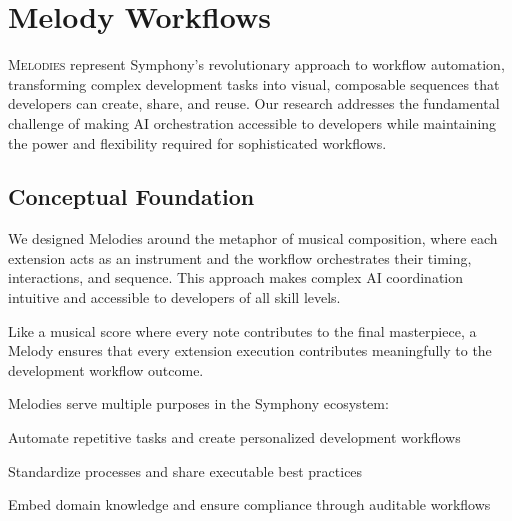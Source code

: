 
\section*{Melody Workflows}

\lettrine{M}{elodies} represent Symphony's revolutionary approach to workflow automation, transforming complex development tasks into visual, composable sequences that developers can create, share, and reuse. Our research addresses the fundamental challenge of making AI orchestration accessible to developers while maintaining the power and flexibility required for sophisticated workflows.

\subsection*{Conceptual Foundation}

We designed Melodies around the metaphor of musical composition, where each extension acts as an instrument and the workflow orchestrates their timing, interactions, and sequence. This approach makes complex AI coordination intuitive and accessible to developers of all skill levels.

\begin{infobox}[title=Musical Metaphor in Practice]
Like a musical score where every note contributes to the final masterpiece, a Melody ensures that every extension execution contributes meaningfully to the development workflow outcome.
\end{infobox}

Melodies serve multiple purposes in the Symphony ecosystem:

\begin{description}[leftmargin=4cm,labelwidth=3.5cm]
    \item[\textbf{Individual Developers}] Automate repetitive tasks and create personalized development workflows
    \item[\textbf{Development Teams}] Standardize processes and share executable best practices
    \item[\textbf{Organizations}] Embed domain knowledge and ensure compliance through auditable workflows
\end{description}

